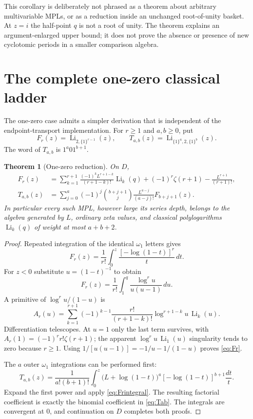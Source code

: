 \documentclass[11pt]{article}
\numberwithin{equation}{section}
\newtheorem{theorem}{Theorem}[section]
\theoremstyle{definition}\newtheorem{definition}[theorem]{Definition}
\theoremstyle{remark}\newtheorem{remark}[theorem]{Remark}
\DeclareMathOperator{\Li}{Li}
\newcommand{\ones}[1]{\{1\}^{#1}}
\begin{document}
This corollary is deliberately not phrased as a theorem about arbitrary
multivariable MPLs, or as a reduction inside an unchanged root-of-unity
basket. At $z=i$ the half-point $q$ is not a root of unity. The theorem
explains an argument-enlarged upper bound; it does not prove the absence
or presence of new cyclotomic periods in a smaller comparison algebra.

\section{The complete one-zero classical ladder}

The one-zero case admits a simpler derivation that is independent of
the endpoint-transport implementation.
For $r\ge1$ and $a,b\ge0$, put
\[
 F_r(z)=\Li_{2,\ones{r-1}}(z),\qquad
 T_{a,b}(z)=\Li_{\ones a,2,\ones b}(z).
\]
The word of $T_{a,b}$ is $1^a01^{b+1}$.

\begin{theorem}[One-zero reduction]\label{thm:onezero}
On $D$,
\begin{align}
 F_r(z)
 &=\sum_{k=1}^{r+1}\frac{(-1)^kL^{r+1-k}}{(r+1-k)!}\Li_k(q)
   +(-1)^r\zeta(r+1)-\frac{L^{r+1}}{(r+1)!},\label{eq:Fr}\\
 T_{a,b}(z)
 &=\sum_{j=0}^{a}(-1)^j\binom{b+j+1}{j}
    \frac{L^{a-j}}{(a-j)!}F_{b+j+1}(z).\label{eq:Tab}
\end{align}
In particular every such MPL, however large its series depth, belongs
to the algebra generated by $L$, ordinary zeta values, and classical
polylogarithms $\Li_k(q)$ of weight at most $a+b+2$.
\end{theorem}
\begin{proof}
Repeated integration of the identical $\omega_1$ letters gives
\begin{equation}\label{eq:Frintegral}
 F_r(z)=\frac1{r!}\int_0^z\frac{[-\log(1-t)]^r}{t}\,dt.
\end{equation}
For $z<0$ substitute $u=(1-t)^{-1}$ to obtain
\[
 F_r(z)=\frac1{r!}\int_1^q\frac{\log^r u}{u(u-1)}\,du.
\]
A primitive of $\log^r u/(1-u)$ is
\[
 A_r(u)=\sum_{k=1}^{r+1}
 (-1)^{k-1}\frac{r!}{(r+1-k)!}\log^{r+1-k}u\,\Li_k(u).
\]
Differentiation telescopes. At $u=1$ only the last term survives, with
$A_r(1)=(-1)^rr!\zeta(r+1)$; the apparent
$\log^r u\,\Li_1(u)$ singularity tends to zero because $r\ge1$.
Using $1/[u(u-1)]=-1/u-1/(1-u)$ proves \eqref{eq:Fr}.

The $a$ outer $\omega_1$ integrations can be performed first:
\begin{equation}\label{eq:singleintegral}
 T_{a,b}(z)=\frac1{a!(b+1)!}\int_0^z
  \bigl(L+\log(1-t)\bigr)^a[-\log(1-t)]^{b+1}\frac{dt}{t}.
\end{equation}
Expand the first power and apply \eqref{eq:Frintegral}.
The resulting factorial coefficient is exactly the binomial coefficient
in \eqref{eq:Tab}. The integrals are convergent at $0$, and continuation
on $D$ completes both proofs.
\end{proof}
\end{document}

